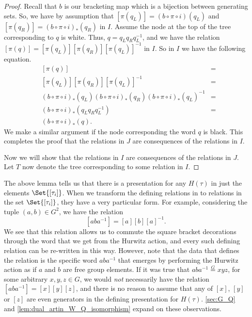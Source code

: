 \begin{proof}
	Recall  that $b$ is our bracketing map which is a bijection between generating sets.
	So, we have by assumption that  $[\pi(q_L)] = (b \circ \pi \circ i)(q_L)$ and $[\pi(q_R)] = (b \circ \pi \circ i)_*(q_R)$ in $I$.
	Assume the node at the top of the tree corresponding to $q$ is white.
	Thus, $q = q_Lq_Rq_L^{-1}$, and we have the relation  $[\pi(q)] = [\pi(q_L)][\pi(q_R)][\pi(q_L)]^{-1}$ in $I$.
	So in $I$ we have the following equation.
	\begin{align*}
		 & [\pi(q)]                                                                                  & = \\
		 & [\pi(q_L)][\pi(q_R)][\pi(q_L)]^{-1}                                                       & = \\
		 & (b \circ \pi \circ i)_*(q_L)(b \circ \pi \circ i)_*(q_R)(b \circ \pi \circ i)_*(q_L)^{-1} & = \\
		 & (b \circ \pi \circ i)_*(q_Lq_Rq_L^{-1})                                                   & = \\
		 & (b \circ \pi \circ i)_*(q).
	\end{align*}
	We make a similar argument if the node corresponding the word $q$ is black.
	This completes the proof that the relations in  $J$ are consequences of the relations in  $I$.

	Now we will show that the relations in $I$ are consequences of the relations in  $J$.
	Let $T$ now denote the tree corresponding to some relation in $I$.
\end{proof}


\begin{remark}
	\label{rmk:relations_in_hurwitz_group}
	The above lemma tells us that there is a presentation for any $H(\tau)$ in just the elements $\Set{[\tau_i]} $.
	When we transform the defining relations in to relations in the set $\Set{[\tau_i]} $, they have a very particular form.
	For example, considering the tuple $(a,b) \in G^2$, we have the relation
	\[
		[aba^{-1}]=[a][b][a]^{-1}
		.\]
	We see that this relation allows us to commute the square bracket decorations through the word that we get from the Hurwitz action, and every such defining relation can be re-written in this way.
	However, note that the data that defines the relation is the specific word $aba^{-1}$ that emerges by performing the Hurwitz action as if $a$ and $b$ are free group elements.
	If it was true that $aba^{-1} \stackrel{G}{=} xyz$, for some arbitrary $x,y,z \in G$, we would \emph{not} necessarily have the relation $[aba^{-1}]=[x][y][z]$, and there is no reason to assume that any of $[x]$, $[y]$ or $[z]$ are even generators in the defining presentation for $H(\tau)$.
	\cref{sec:G_Q} and \cref{lem:dual_artin_W_Q_isomorphism} expand on these observations.
\end{remark}

